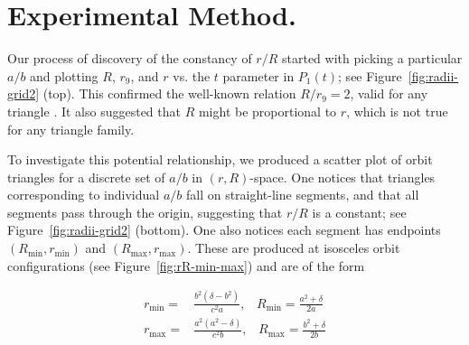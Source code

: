 \documentclass{article}
\theoremstyle{definition}
\begin{document}
\section{Experimental Method.}
\label{sec:experimental}
Our process of discovery of the constancy of $r/R$ started with picking a particular $a/b$ and plotting $R$, $r_9$, and $r$ vs. the $t$ parameter in $P_1(t)$; see Figure~\ref{fig:radii-grid2} (top). This confirmed the well-known relation $R/r_9=2$, valid for any triangle \cite{coxeter67}. It also suggested  that $R$ might be proportional to $r$, which is not true for any triangle family.

To investigate this potential relationship, we produced a scatter plot of orbit triangles for a discrete set of $a/b$ in $(r,R)$-space. One notices that triangles corresponding to individual $a/b$ fall on straight-line segments, and that all segments pass through the origin, suggesting that $r/R$ is a constant; see Figure~\ref{fig:radii-grid2} (bottom). One also notices each segment has endpoints $(R_\text{min},r_\text{min})$ and $(R_\text{max},r_\text{max})$. These are produced at isosceles orbit configurations (see Figure~\ref{fig:rR-min-max}) and are of the form

\begin{align}
r_{\mathrm{min}}=&  \frac{b^2(\delta - b^2)}{c^2 a},\;\;\;R_{\mathrm{min}}= \frac{a^2+\delta}{2a} \nonumber \\
r_{\mathrm{max}}=&  \frac{a^2(a^2 - \delta)}{c^2 b},\;\;\;R_{\mathrm{max}}= \frac{b^2+\delta}{2b}
\label{eqn:rmin-rmax}
\end{align}
\end{document}
